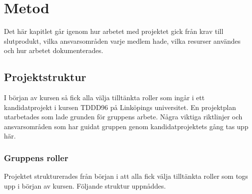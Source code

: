 \chapter{Metod}
\label{cha:method}
Det här kapitlet går igenom hur arbetet med projektet gick från krav till slutprodukt, vilka ansvarsområden varje medlem hade, vilka resurser användes och hur arbetet dokumenterades. 

\section{Projektstruktur}
I början av kursen så fick alla välja tilltänkta roller som ingår i ett kandidatprojekt i kursen TDDD96 på Linköpings universitet. En projektplan utarbetades som lade grunden för gruppens arbete. Några viktiga riktlinjer och ansvarsområden som har guidat gruppen genom kandidatprojektets gång tas upp här.

\subsection{Gruppens roller}
Projektet strukturerades från början i att alla fick välja tilltänkta roller som togs upp i början av kursen. Följande struktur uppnåddes.

